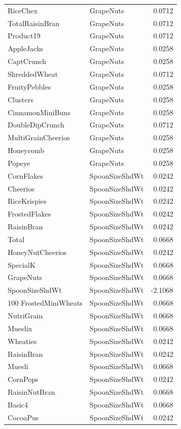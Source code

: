 \begin{longtable}{llr}
RiceChex & GrapeNuts & 0.0712 \\
TotalRaisinBran & GrapeNuts & 0.0712 \\
Product19 & GrapeNuts & 0.0712 \\
AppleJacks & GrapeNuts & 0.0258 \\
CaptCrunch & GrapeNuts & 0.0258 \\
ShreddedWheat & GrapeNuts & 0.0712 \\
FruityPebbles & GrapeNuts & 0.0258 \\
Clusters & GrapeNuts & 0.0258 \\
CinnamonMiniBuns & GrapeNuts & 0.0258 \\
DoubleDipCrunch & GrapeNuts & 0.0712 \\
MultiGrainCheerios & GrapeNuts & 0.0258 \\
Honeycomb & GrapeNuts & 0.0258 \\
Popeye & GrapeNuts & 0.0258 \\
CornFlakes & SpoonSizeShdWt & 0.0242 \\
Cheerios & SpoonSizeShdWt & 0.0242 \\
RiceKrispies & SpoonSizeShdWt & 0.0242 \\
FrostedFlakes & SpoonSizeShdWt & 0.0242 \\
RaisinBran & SpoonSizeShdWt & 0.0242 \\
Total & SpoonSizeShdWt & 0.0668 \\
HoneyNutCheerios & SpoonSizeShdWt & 0.0242 \\
SpecialK & SpoonSizeShdWt & 0.0668 \\
GrapeNuts & SpoonSizeShdWt & 0.0668 \\
SpoonSizeShdWt & SpoonSizeShdWt & -2.1068 \\
100%
FrostedMiniWheats & SpoonSizeShdWt & 0.0668 \\
NutriGrain & SpoonSizeShdWt & 0.0668 \\
Mueslix & SpoonSizeShdWt & 0.0668 \\
Wheaties & SpoonSizeShdWt & 0.0242 \\
RaisinBran & SpoonSizeShdWt & 0.0242 \\
Muesli & SpoonSizeShdWt & 0.0668 \\
CornPops & SpoonSizeShdWt & 0.0242 \\
RaisinNutBran & SpoonSizeShdWt & 0.0668 \\
Basic4 & SpoonSizeShdWt & 0.0668 \\
CocoaPus & SpoonSizeShdWt & 0.0242 \\

\end{longtable}
